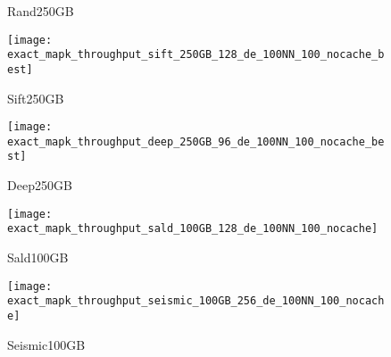 {{\begin{figure*}[tb]
\begin{minipage}{0.76\textwidth}
\begin{subfigure}{0.18\textwidth}
		\caption{Rand250GB} 
		\label{fig:approx:accuracy:throughput:synthetic:250GB:256:hdd:de:100NN:100:nocache:best}
	\end{subfigure}
	\begin{subfigure}{0.18\textwidth}
		\centering
		\texttt{[image: exact\_mapk\_throughput\_sift\_250GB\_128\_de\_100NN\_100\_nocache\_best]}
		\caption{Sift250GB} 
		\label{fig:approx:accuracy:throughput:sift:250GB:128:hdd:ng:100NN:100:nocache:best}
	\end{subfigure}
	\begin{subfigure}{0.18\textwidth}
		\centering
		\texttt{[image: exact\_mapk\_throughput\_deep\_250GB\_96\_de\_100NN\_100\_nocache\_best]}
		\caption{Deep250GB} 
		\label{fig:approx:accuracy:throughput:deep:250GB:96:hdd:ng:100NN:100:nocache:best}
	\end{subfigure}
	\begin{subfigure}{0.18\textwidth}
		\centering
		\texttt{[image: exact\_mapk\_throughput\_sald\_100GB\_128\_de\_100NN\_100\_nocache]}
		\caption{Sald100GB} 
		\label{fig:approx:accuracy:throughput:sald:100GB:128:hdd:ng:100NN:100:nocache:best}
	\end{subfigure}	
	\begin{subfigure}{0.18\textwidth}
		\centering
		\texttt{[image: exact\_mapk\_throughput\_seismic\_100GB\_256\_de\_100NN\_100\_nocache]}
		\caption{Seismic100GB} 
		\label{fig:approx:accuracy:throughput:seismic:100GB:256:hdd:ng:100NN:100:nocache:best}
	\end{subfigure}	


\end{minipage}
\end{figure*}}}
